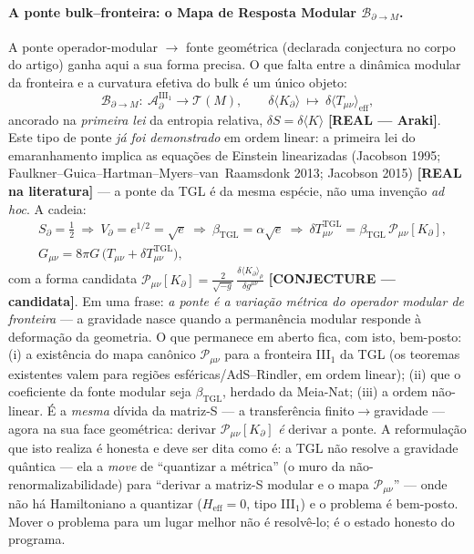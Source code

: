 \documentclass[12pt,a4paper]{article}
\newcommand{\betatgl}{\beta_{\text{TGL}}}
\newcommand{\TGL}{\textsc{TGL}}
\begin{document}
\paragraph{A ponte bulk--fronteira: o Mapa de Resposta Modular $\mathcal B_{\partial\to M}$.} A ponte operador-modular $\to$ fonte geométrica (declarada conjectura no corpo do artigo) ganha aqui a sua forma precisa. O que falta entre a dinâmica modular da fronteira e a curvatura efetiva do bulk é um único objeto:
\begin{equation}\mathcal B_{\partial\to M}:\ \mathcal A_\partial^{\mathrm{III}_1}\to\mathcal T(M),\qquad \delta\langle K_\partial\rangle\ \longmapsto\ \delta\langle T_{\mu\nu}\rangle_{\mathrm{eff}},\end{equation}ancorado na \emph{primeira lei} da entropia relativa, $\delta S=\delta\langle K\rangle$ \textbf{[REAL --- Araki]}. Este tipo de ponte \emph{já foi demonstrado} em ordem linear: a primeira lei do emaranhamento implica as equações de Einstein linearizadas (Jacobson 1995; Faulkner--Guica--Hartman--Myers--van~Raamsdonk 2013; Jacobson 2015) \textbf{[REAL na literatura]} --- a ponte da \TGL{} é da mesma espécie, não uma invenção \emph{ad hoc}. A cadeia:
\begin{equation}
\begin{aligned}
&S_\partial=\tfrac12\ \Rightarrow\ V_\partial=e^{1/2}=\sqrt e\ \Rightarrow\ \betatgl=\alpha\sqrt e\ \Rightarrow\ \delta T^{\mathrm{TGL}}_{\mu\nu}=\betatgl\,\mathcal P_{\mu\nu}[K_\partial],\\
&G_{\mu\nu}=8\pi G\,\big(T_{\mu\nu}+\delta T^{\mathrm{TGL}}_{\mu\nu}\big),
\end{aligned}
\end{equation}com a forma candidata $\mathcal P_{\mu\nu}[K_\partial]=\frac{2}{\sqrt{-g}}\,\frac{\delta\langle K_\partial\rangle_\rho}{\delta g^{\mu\nu}}$ \textbf{[CONJECTURE --- candidata]}. Em uma frase: \emph{a ponte é a variação métrica do operador modular de fronteira} --- a gravidade nasce quando a permanência modular responde à deformação da geometria. O que permanece em aberto fica, com isto, bem-posto: (i) a existência do mapa canônico $\mathcal P_{\mu\nu}$ para a fronteira III$_1$ da \TGL{} (os teoremas existentes valem para regiões esféricas/AdS--Rindler, em ordem linear); (ii) que o coeficiente da fonte modular seja $\betatgl$, herdado da Meia-Nat; (iii) a ordem não-linear. É a \emph{mesma} dívida da matriz-S --- a transferência finito$\to$gravidade --- agora na sua face geométrica: derivar $\mathcal P_{\mu\nu}[K_\partial]$ \emph{é} derivar a ponte. A reformulação que isto realiza é honesta e deve ser dita como é: a \TGL{} não resolve a gravidade quântica --- ela a \emph{move} de ``quantizar a métrica\textquotedblright{} (o muro da não-renormalizabilidade) para ``derivar a matriz-S modular e o mapa $\mathcal P_{\mu\nu}$\textquotedblright{} --- onde não há Hamiltoniano a quantizar ($H_{\mathrm{eff}}=0$, tipo III$_1$) e o problema é bem-posto. Mover o problema para um lugar melhor não é resolvê-lo; é o estado honesto do programa.
\end{document}

